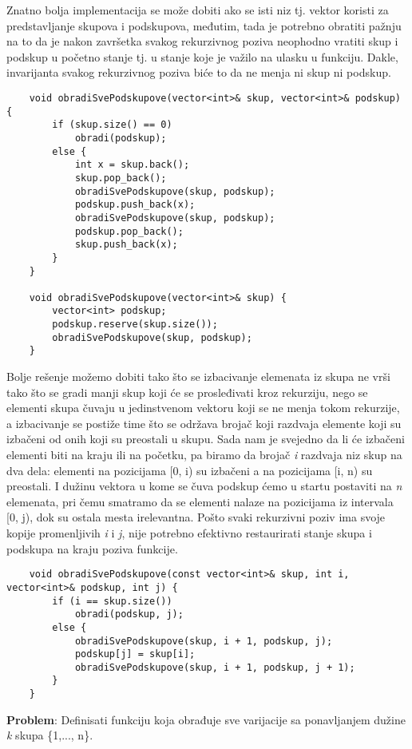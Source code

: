 \documentclass{article}
\begin{document}
Znatno bolja implementacija
se može dobiti ako se isti niz tj. vektor koristi za predstavljanje skupova i
podskupova, međutim, tada je potrebno obratiti pažnju na to da je nakon
završetka svakog rekurzivnog poziva neophodno vratiti skup i podskup u početno
stanje tj. u stanje koje je važilo na ulasku u funkciju. Dakle, invarijanta svakog
rekurzivnog poziva biće to da ne menja ni skup ni podskup.
\begin{lstlisting}
    void obradiSvePodskupove(vector<int>& skup, vector<int>& podskup) {
        if (skup.size() == 0)
            obradi(podskup);
        else {
            int x = skup.back();
            skup.pop_back();
            obradiSvePodskupove(skup, podskup);
            podskup.push_back(x);
            obradiSvePodskupove(skup, podskup);
            podskup.pop_back();
            skup.push_back(x);
        }
    }

    void obradiSvePodskupove(vector<int>& skup) {
        vector<int> podskup;
        podskup.reserve(skup.size());
        obradiSvePodskupove(skup, podskup);
    }
\end{lstlisting}
Bolje rešenje možemo dobiti tako što se izbacivanje elemenata iz skupa ne vrši
tako što se gradi manji skup koji će se prosleđivati kroz
rekurziju, nego se elementi skupa čuvaju u jedinstvenom vektoru koji se
ne menja tokom rekurzije, a izbacivanje se postiže time što se održava brojač koji
razdvaja elemente koji su izbačeni od onih koji su preostali u skupu. Sada nam je svejedno da li će izbačeni elementi biti na kraju ili na početku, pa biramo da brojač
\textit{i} razdvaja niz skup na dva dela: elementi na pozicijama [0, i) su izbačeni a na
pozicijama [i, n) su preostali. I dužinu vektora
u kome se čuva podskup ćemo u startu postaviti na \textit{n} elemenata, pri čemu smatramo da se elementi nalaze na pozicijama iz intervala [0, j), dok su ostala
mesta irelevantna. Pošto svaki rekurzivni poziv ima svoje kopije promenljivih \textit{i} i
\textit{j}, nije potrebno efektivno restaurirati stanje skupa i podskupa na kraju poziva
funkcije.
\begin{lstlisting}
    void obradiSvePodskupove(const vector<int>& skup, int i, vector<int>& podskup, int j) {
        if (i == skup.size()) 
            obradi(podskup, j);
        else {
            obradiSvePodskupove(skup, i + 1, podskup, j);
            podskup[j] = skup[i];
            obradiSvePodskupove(skup, i + 1, podskup, j + 1);
        }
    }
\end{lstlisting}\vspace{0.2cm}
\textbf{Problem}: Definisati funkciju koja obrađuje sve varijacije sa ponavljanjem dužine \textit{k} skupa \{1,..., n\}.
\end{document}
